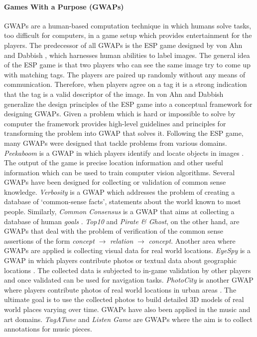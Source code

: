 \paragraph{Games With a Purpose (GWAPs)}
GWAPs are a human-based computation technique in which humans solve tasks, too difficult for computers, in a game setup which provides entertainment for the players. The predecessor of all GWAPs is the ESP game designed by von Ahn and Dabbish \cite{CHI2004:vonAhn}, which harnesses human abilities to label images. The general idea of the ESP game is that two players who can see the same image try to come up with matching tags. The players are paired up randomly without any means of communication. Therefore, when players agree on a tag it is a strong indication that the tag is a valid descriptor of the image. In \cite{vonAhn:2008:DGP:1378704.1378719} von Ahn and Dabbish generalize the design principles of the ESP game into a conceptual framework for designing GWAPs. Given a problem which is hard or impossible to solve by computer the framework provides high-level guidelines and principles for transforming the problem into GWAP that solves it. Following the ESP game, many GWAPs were designed that tackle problems from various domains. \textit{Peekaboom} is a GWAP in which players identify and locate objects in images \cite{vonAhn:2006:PGL:1124772.1124782}. The output of the game is precise location information and other useful information which can be used to train computer vision algorithms. Several GWAPs have been designed for collecting or validation of common sense knowledge. \textit{Verbosity} is a GWAP \cite{vonAhn:2006:VGC:1124772.1124784} which addresses the problem of creating a database of `common-sense facts', statements about the world known to most people. Similarly, \textit{Common Consensus} is a GWAP that aims at collecting a database of human \textit{goals} \cite{lieberman2007}. \textit{Top10} and \textit{Pirate \& Ghost}\cite{DBLP:conf/aaaifs/ChangCH10}, on the other hand, are GWAPs that deal with the problem of verification of the common sense assertions of the form \textit{concept} $\rightarrow$ \textit{relation} $\rightarrow$ \textit{concept}. Another area where GWAPs are applied is collecting visual data for real world locations. \textit{EyeSpy} is a GWAP in which players contribute photos or textual data about geographic locations \cite{Bell:2009:ESN:1518701.1518723}. The collected data is subjected to in-game validation by other players and once validated can be used for navigation tasks. \textit{PhotoCity} is another GWAP where players contribute photos of real world locations in urban areas \cite{Tuite:2010:RWB:1822348.1822379,Tuite:2011:PTE:1978942.1979146}. The ultimate goal is to use the collected photos to build detailed 3D models of real world places varying over time. GWAPs have also been applied in the music and art domains. \textit{TagATune} \cite{Law2007,Law:2009:INM:1518701.1518881} and  \textit{Listen Game} \cite{Turnbull07agame-based} are GWAPs where the aim is to collect annotations for music pieces. 
